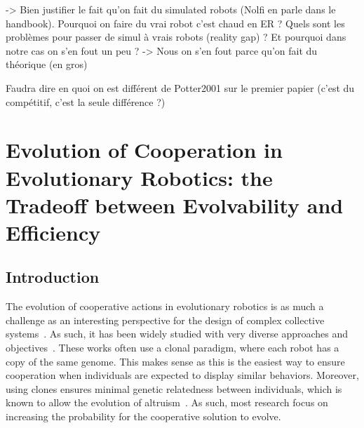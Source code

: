     -> Bien justifier le fait qu'on fait du simulated robots (Nolfi en parle dans le handbook). Pourquoi on faire du vrai robot c'est chaud en ER ? Quels sont les problèmes pour passer de simul à vrais robots (reality gap) ? Et pourquoi dans notre cas on s'en fout un peu ? 
          -> Nous on s'en fout parce qu'on fait du théorique (en gros)

    Faudra dire en quoi on est différent de Potter2001 sur le premier papier (c'est du compétitif, c'est la seule différence ?)







































\section{Evolution of Cooperation in Evolutionary Robotics: the Tradeoff between Evolvability and Efficiency}

  \subsection{Introduction}

  The evolution of cooperative actions in evolutionary robotics is as much a challenge as an interesting perspective for the design of complex collective systems~\cite{Doncieux2015}. As such, it has been widely studied with very diverse approaches and objectives~\cite{Waibel2009, Hauert2014, Trianni2007, Lichocki2012}. These works often use a clonal paradigm, where each robot has a copy of the same genome. This makes sense as this is the easiest way to ensure cooperation when individuals are expected to display similar behaviors. Moreover, using clones ensures minimal genetic relatedness between individuals, which is known to allow the evolution of altruism~\cite{Waibel2011, Montanier2011}. As such, most research focus on increasing the probability for the cooperative solution to evolve.

